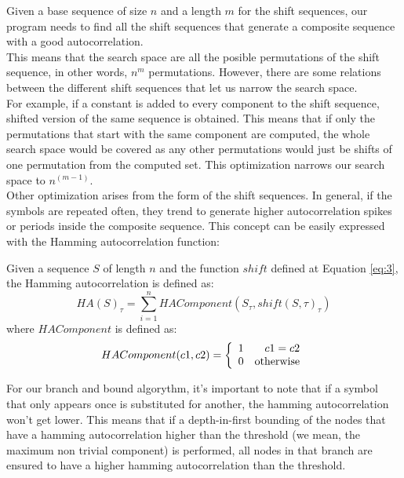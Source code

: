   Given a base sequence of size $n$ and a length $m$ for the shift sequences,
  our program needs to find all the shift sequences that generate a composite
  sequence with a good autocorrelation.\\

  This means that the search space are all the posible permutations of the
  shift sequence, in other words, $n^m$ permutations. However, there are some
  relations between the different shift sequences that let us narrow the
  search space.\\

  For example, if a constant is added to every component to the shift sequence,
  shifted version of the same sequence is obtained. This means that if only
  the permutations that start with the same component are computed,
  the whole search space would be covered as any other permutations would just
  be shifts of one permutation from the computed set. This optimization narrows
  our search space to $n^{(m-1)}$.\\

  Other optimization arises from the form of the shift sequences. In general,
  if the symbols are repeated often, they trend to generate higher
  autocorrelation spikes or periods inside the composite sequence. This
  concept can be easily expressed with the Hamming autocorrelation function:\\

  \begin{definition}
    Given a sequence $S$ of length $n$ and the function $shift$ defined at
    Equation \eqref{eq:3}, the Hamming autocorrelation is defined as:
      \begin{equation} \label{hamming:eq:1}
        HA(S)_{\tau} = \sum_{i=1}^{n} HAComponent(S_{\tau}, shift(S, \tau)_{\tau})
      \end{equation}
    where $HAComponent$ is defined as:
      \begin{equation}
        HAComponent(c1, c2) = \left\{\begin{array}{lr}
            1  &  c1 = c2\\
            0  & \textnormal{otherwise} \\
        \end{array}\right.
      \end{equation}
  \end{definition}

  For our branch and bound algorythm, it's important to note that if a symbol
  that only appears once is substituted for another, the hamming
  autocorrelation won't get lower. This means that if a depth-in-first
  bounding of the nodes that have a hamming autocorrelation higher than the
  threshold (we mean, the maximum non trivial component) is performed,
  all nodes in that branch are ensured to have a higher hamming autocorrelation
  than the threshold.\\

